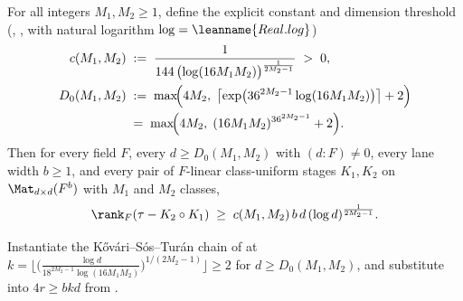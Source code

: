 \begin{theorem}\label{thm:2b}
For all integers $M_1, M_2 \ge 1$, define the explicit constant and dimension threshold
(, , with natural logarithm
$\log = \leanname{Real.log}$)
\begin{align*}
  c(M_1, M_2) &\;:=\; \frac{1}{144\,\bigl(\log(16 M_1 M_2)\bigr)^{\frac{1}{2M_2 - 1}}} \;>\; 0, \\
  D_0(M_1, M_2) &\;:=\; \max\!\Bigl(4M_2,\; \bigl\lceil \exp\bigl(36^{2M_2-1}\log(16 M_1 M_2)\bigr)\bigr\rceil + 2\Bigr) \\
  &\;=\; \max\!\Bigl(4M_2,\; (16 M_1 M_2)^{36^{2M_2 - 1}} + 2\Bigr).
\end{align*}
Then for every field $F$, every $d \ge D_0(M_1,M_2)$ with $(d : F) \ne 0$, every lane width
$b \ge 1$, and every pair of $F$-linear class-uniform stages $K_1, K_2$ on $\Mat_{d\times d}(F^b)$
with $M_1$ and $M_2$ classes,
\[
  \rank_F(\tau - K_2 \circ K_1)
  \;\ge\;
  c(M_1, M_2)\,b\,d\,(\log d)^{\frac{1}{2M_2 - 1}}.
\]
\end{theorem}
\begin{outline}
Instantiate the K\H{o}v\'ari--S\'os--Tur\'an chain of  at
$k = \bigl\lfloor \bigl(\frac{\log d}{18^{2M_2-1}\log(16M_1 M_2)}\bigr)^{1/(2M_2-1)}\bigr\rfloor \ge 2$
for $d \ge D_0(M_1, M_2)$, and substitute into $4r \ge b k d$ from .
\end{outline}


